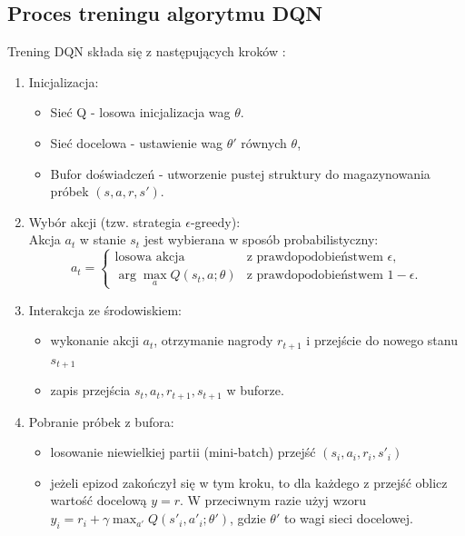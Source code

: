\documentclass[a4paper, 12pt]{article}
\numberwithin{equation}{section}
\begin{document}
    \subsection{Proces treningu algorytmu DQN}
    Trening DQN składa się z następujących kroków \cite{lapan2020deep}:
    \begin{enumerate}
        \item Inicjalizacja:
        \begin{itemize}
            \item Sieć Q - losowa inicjalizacja wag \( \theta \).
            \item Sieć docelowa - ustawienie wag \( \theta' \) równych \( \theta \),
            \item Bufor doświadczeń - utworzenie pustej struktury do magazynowania próbek \( (s,a,r,s') \).
        \end{itemize}
        \item Wybór akcji (tzw. strategia \( \epsilon \)-greedy): \\
        Akcja \( a_t \) w stanie \( s_t \) jest wybierana w sposób probabilistyczny:
        \[
        a_t =
        \begin{cases} 
        \text{losowa akcja} & \text{z prawdopodobieństwem } \epsilon, \\
        \arg\max\limits_{a} Q(s_t, a; \theta) & \text{z prawdopodobieństwem } 1 - \epsilon.
        \end{cases}
        \]
        \item Interakcja ze środowiskiem:
        \begin{itemize}
            \item wykonanie akcji \( a_t \), otrzymanie nagrody \( r_{t+1} \) i przejście do nowego stanu \( s_{t+1} \)
            \item zapis przejścia \( s_t, a_t, r_{t+1}, s_{t+1} \)  w buforze.
        \end{itemize}
        \item Pobranie próbek z bufora:
        \begin{itemize}
            \item losowanie niewielkiej partii (mini-batch) przejść \( {(s_i, a_i, r_i, s'_i)} \)
            \item jeżeli epizod zakończył się w tym kroku, to dla każdego z przejść oblicz wartość docelową \( y = r \). W przeciwnym razie użyj 
            wzoru \( y_i = r_i + \gamma \max_{a'} Q(s'_i, a'_i; \theta') \), gdzie \( \theta' \) to wagi sieci docelowej.
        \end{itemize}

\end{enumerate}
\end{document}
